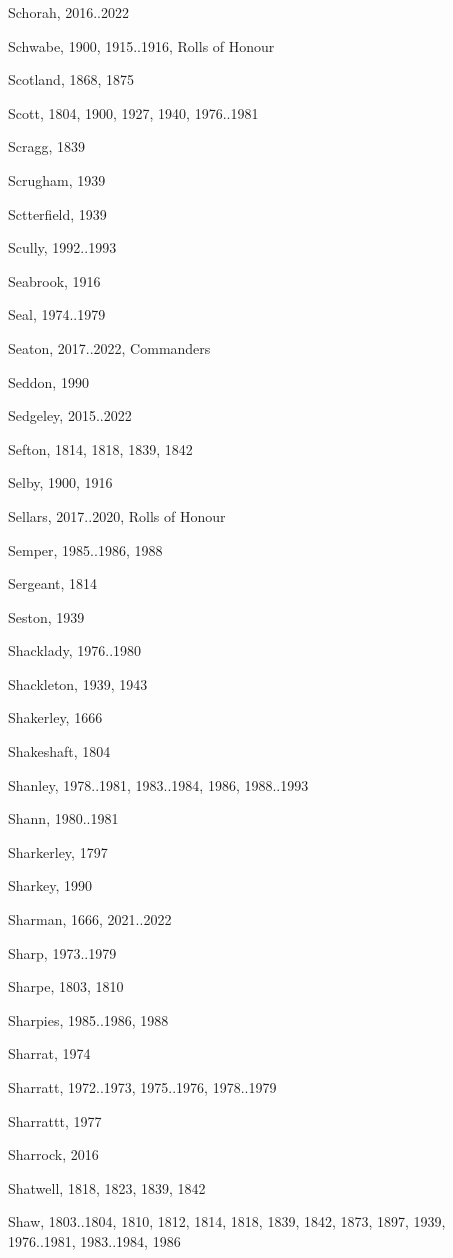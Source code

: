 \begin{theindex}
\item Schorah, 2016..2022
\item Schwabe, 1900, 1915..1916, Rolls of Honour
\item Scotland, 1868, 1875
\item Scott, 1804, 1900, 1927, 1940, 1976..1981
\item Scragg, 1839
\item Scrugham, 1939
\item Sctterfield, 1939
\item Scully, 1992..1993
\item Seabrook, 1916
\item Seal, 1974..1979
\item Seaton, 2017..2022, Commanders
\item Seddon, 1990
\item Sedgeley, 2015..2022
\item Sefton, 1814, 1818, 1839, 1842
\item Selby, 1900, 1916
\item Sellars, 2017..2020, Rolls of Honour
\item Semper, 1985..1986, 1988
\item Sergeant, 1814
\item Seston, 1939
\item Shacklady, 1976..1980
\item Shackleton, 1939, 1943
\item Shakerley, 1666
\item Shakeshaft, 1804
\item Shanley, 1978..1981, 1983..1984, 1986, 1988..1993
\item Shann, 1980..1981
\item Sharkerley, 1797
\item Sharkey, 1990
\item Sharman, 1666, 2021..2022
\item Sharp, 1973..1979
\item Sharpe, 1803, 1810
\item Sharpies, 1985..1986, 1988
\item Sharrat, 1974
\item Sharratt, 1972..1973, 1975..1976, 1978..1979
\item Sharrattt, 1977
\item Sharrock, 2016
\item Shatwell, 1818, 1823, 1839, 1842
\item Shaw, 1803..1804, 1810, 1812, 1814, 1818, 1839, 1842, 1873, 1897, 1939, 1976..1981, 1983..1984, 1986

\end{theindex}
